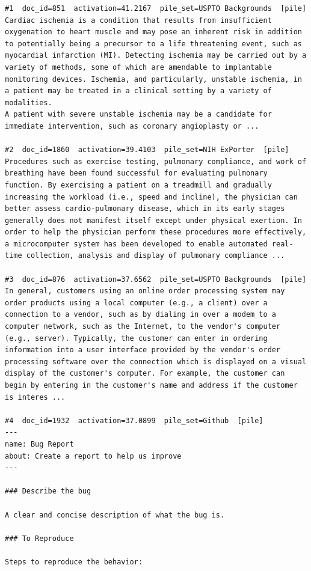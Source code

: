 \begin{verbatim}
#1  doc_id=851  activation=41.2167  pile_set=USPTO Backgrounds  [pile]
Cardiac ischemia is a condition that results from insufficient oxygenation to heart muscle and may pose an inherent risk in addition to potentially being a precursor to a life threatening event, such as myocardial infarction (MI). Detecting ischemia may be carried out by a variety of methods, some of which are amendable to implantable monitoring devices. Ischemia, and particularly, unstable ischemia, in a patient may be treated in a clinical setting by a variety of modalities.
A patient with severe unstable ischemia may be a candidate for immediate intervention, such as coronary angioplasty or ...

#2  doc_id=1860  activation=39.4103  pile_set=NIH ExPorter  [pile]
Procedures such as exercise testing, pulmonary compliance, and work of breathing have been found successful for evaluating pulmonary function. By exercising a patient on a treadmill and gradually increasing the workload (i.e., speed and incline), the physician can better assess cardio-pulmonary disease, which in its early stages generally does not manifest itself except under physical exertion. In order to help the physician perform these procedures more effectively, a microcomputer system has been developed to enable automated real-time collection, analysis and display of pulmonary compliance ...

#3  doc_id=876  activation=37.6562  pile_set=USPTO Backgrounds  [pile]
In general, customers using an online order processing system may order products using a local computer (e.g., a client) over a connection to a vendor, such as by dialing in over a modem to a computer network, such as the Internet, to the vendor's computer (e.g., server). Typically, the customer can enter in ordering information into a user interface provided by the vendor's order processing software over the connection which is displayed on a visual display of the customer's computer. For example, the customer can begin by entering in the customer's name and address if the customer is interes ...

#4  doc_id=1932  activation=37.0899  pile_set=Github  [pile]
---
name: Bug Report
about: Create a report to help us improve
---

### Describe the bug

A clear and concise description of what the bug is.

### To Reproduce

Steps to reproduce the behavior:


\end{verbatim}

